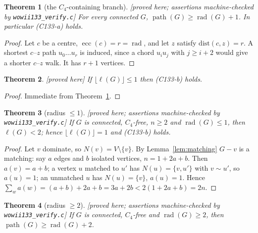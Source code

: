 \documentclass[11pt]{article}
\theoremstyle{plain}
\newtheorem{theorem}{Theorem}[section]
\theoremstyle{definition}
\theoremstyle{remark}
\numberwithin{equation}{section}
\newcommand{\rad}{\operatorname{rad}}
\newcommand{\ecc}{\operatorname{ecc}}
\newcommand{\pth}{\operatorname{path}}
\newcommand{\statusbox}[1]{{\small\sloppy\textsf{[#1]}}}
\newcommand{\PRV}[1]{\statusbox{proved here; assertions machine-checked by \texttt{#1}}}
\newcommand{\PRVn}{\statusbox{proved here}}
\begin{document}
\begin{theorem}[the $C_4$-containing branch]\label{thm:A}
\PRV{wowii133\_verify.c}
For every connected $G$, $\pth(G) \ge \rad(G) + 1$. In particular (C133-a) holds.
\end{theorem}

\begin{proof}
Let $c$ be a centre, $\ecc(c) = r = \rad$, and let $z$ satisfy $\mathrm{dist}(c,z) = r$. A
shortest $c$--$z$ path $u_0\dots u_r$ is induced, since a chord $u_iu_j$ with $j \ge i+2$
would give a shorter $c$--$z$ walk. It has $r+1$ vertices.
\end{proof}

\begin{theorem}\label{thm:B}
\PRVn
If $\lfloor \ell(G)\rfloor \le 1$ then (C133-b) holds.
\end{theorem}

\begin{proof}
Immediate from Theorem~\ref{thm:A}.
\end{proof}

\begin{theorem}[radius $\le 1$]\label{thm:C}
\PRV{wowii133\_verify.c}
If $G$ is connected, $C_4$-free, $n \ge 2$ and $\rad(G) \le 1$, then $\ell(G) < 2$; hence
$\lfloor \ell(G)\rfloor = 1$ and (C133-b) holds.
\end{theorem}

\begin{proof}
Let $v$ dominate, so $N(v) = V \setminus \{v\}$. By Lemma~\ref{lem:matching} $G - v$ is a
matching: say $a$ edges and $b$ isolated vertices, $n = 1 + 2a + b$. Then $a(v) = a+b$; a
vertex $u$ matched to $u'$ has $N(u) = \{v, u'\}$ with $v \sim u'$, so $a(u) = 1$; an
unmatched $u$ has $N(u) = \{v\}$, $a(u) = 1$. Hence
$\sum_w a(w) = (a+b) + 2a + b = 3a + 2b < 2(1+2a+b) = 2n$.
\end{proof}

\begin{theorem}[radius $\ge 2$]\label{thm:D}
\PRV{wowii133\_verify.c}
If $G$ is connected, $C_4$-free and $\rad(G) \ge 2$, then $\pth(G) \ge \rad(G) + 2$.
\end{theorem}
\end{document}
